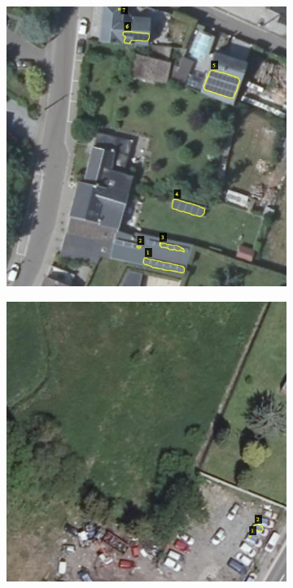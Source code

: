 \documentclass[a4paper, 12pt]{article}
\begin{document}
\begin{figure}[h]
\begin{subfigure}{0.31\textwidth}
		\vspace{0em}
	\end{subfigure}
	\hspace{0.5em}
	\begin{subfigure}{0.31\textwidth}
		\centering
		\includegraphics[width=\textwidth]{resources/jpg/609270_533246.jpg}
		\vspace{0em}
	\end{subfigure}
	\hspace{0.5em}
	\begin{subfigure}{0.31\textwidth}
		\centering
		\includegraphics[width=\textwidth]{resources/jpg/609468_532552.jpg}

\end{subfigure}
\end{figure}
\end{document}
